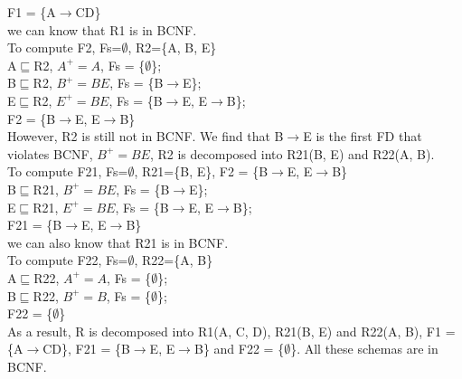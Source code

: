 \documentclass[]{article}
\begin{document}
	\noindent F1 = \{A$\rightarrow$CD\}   \\
	
	\noindent we can know that R1 is in BCNF.  \\
	
	\noindent To compute F2, Fs=$\emptyset$, R2=\{A, B, E\}   \\
	
	A$\sqsubseteq$R2, $A^{+}=A$, Fs = \{$\emptyset$\};   \\
	
	B$\sqsubseteq$R2, $B^{+}=BE$, Fs = \{B$\rightarrow$E\};   \\
	
	E$\sqsubseteq$R2, $E^{+}=BE$, Fs = \{B$\rightarrow$E, E$\rightarrow$B\};   \\
	
	\noindent F2 = \{B$\rightarrow$E, E$\rightarrow$B\}   \\
	
	\noindent However, R2 is still not in BCNF. We find that B$\rightarrow$E is the first FD that violates BCNF, $B^{+}=BE$, R2 is decomposed into R21(B, E) and R22(A, B).   \\
	
	\noindent To compute F21, Fs=$\emptyset$, R21=\{B, E\}, F2 = \{B$\rightarrow$E, E$\rightarrow$B\}   \\
	
	B$\sqsubseteq$R21, $B^{+}=BE$, Fs = \{B$\rightarrow$E\};   \\
	
	E$\sqsubseteq$R21, $E^{+}=BE$, Fs = \{B$\rightarrow$E, E$\rightarrow$B\};   \\

	\noindent F21 = \{B$\rightarrow$E, E$\rightarrow$B\}   \\
	
	\noindent we can also know that R21 is in BCNF.  \\
	
	\noindent To compute F22, Fs=$\emptyset$, R22=\{A, B\}   \\
	
	A$\sqsubseteq$R22, $A^{+}=A$, Fs = \{$\emptyset$\};   \\
	
	B$\sqsubseteq$R22, $B^{+}=B$, Fs = \{$\emptyset$\};   \\
	
	\noindent F22 = \{$\emptyset$\}   \\
	
	\noindent As a result, R is decomposed into R1(A, C, D), R21(B, E) and R22(A, B), F1 = \{A$\rightarrow$CD\}, F21 = \{B$\rightarrow$E, E$\rightarrow$B\} and F22 = \{$\emptyset$\}. All these schemas are in BCNF.  \\
	
\end{document}
